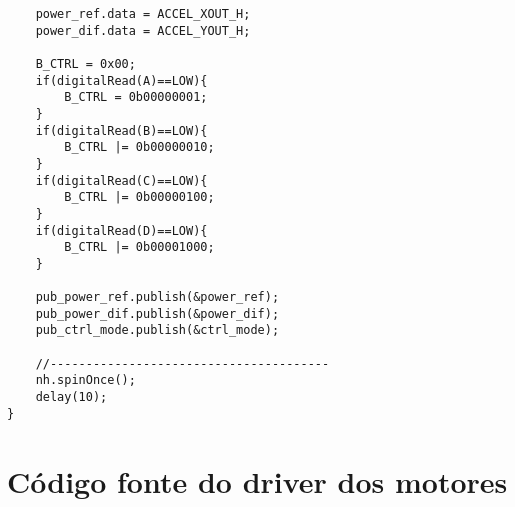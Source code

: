 \begin{lstlisting}
    power_ref.data = ACCEL_XOUT_H;
    power_dif.data = ACCEL_YOUT_H;
    
    B_CTRL = 0x00;
    if(digitalRead(A)==LOW){
        B_CTRL = 0b00000001;
    }
    if(digitalRead(B)==LOW){
        B_CTRL |= 0b00000010;
    }
    if(digitalRead(C)==LOW){
        B_CTRL |= 0b00000100;
    }   
    if(digitalRead(D)==LOW){
        B_CTRL |= 0b00001000;
    }

    pub_power_ref.publish(&power_ref);
    pub_power_dif.publish(&power_dif);
    pub_ctrl_mode.publish(&ctrl_mode); 

    //---------------------------------------
    nh.spinOnce();
    delay(10); 	
}
\end{lstlisting}
\pagebreak 

\chapter{Código fonte do driver dos motores}
\label{app:driver_node}
	
